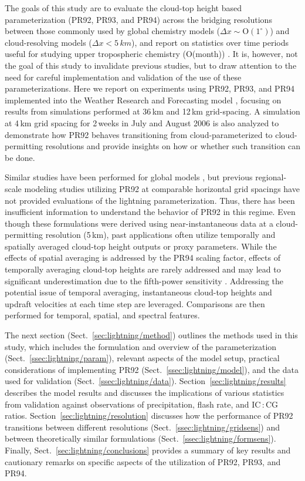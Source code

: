 The goals of this study are to evaluate the cloud-top height based
parameterization (PR92, PR93, and PR94) across the bridging resolutions
between those commonly used by global chemistry models
($\Delta x\sim\mathrm{O}(1^\circ)$) and cloud-resolving models ($\Delta x < 5\,\unit{km}$),
and report on statistics over time periods useful for
studying upper tropospheric chemistry (O(\unit{month}))
\citep{Stevenson:2006fk}. It is, however, not the goal of this study to
invalidate previous studies, but to draw attention to the need for careful
implementation and validation of the use of these parameterizations. Here we
report on experiments using PR92, PR93, and PR94 implemented into the Weather
Research and Forecasting model \citep[WRF;][]{Skamarock:2008xx}, focusing on
results from simulations performed at 36\,\unit{km} and 12\,\unit{km}
grid-spacing. A simulation at 4\,\unit{km} grid spacing for 2\,weeks in July
and August 2006 is also analyzed to demonstrate how PR92 behaves
transitioning from cloud-parameterized to cloud-permitting resolutions and
provide insights on how or whether such transition can be done.

 Similar studies have been performed for global models \citep[e.g.,][]{Tost:2007rw},
 but previous regional-scale modeling studies utilizing PR92 at comparable horizontal
 grid spacings have not provided evaluations of the lightning parameterization. Thus,
 there has been insufficient information to understand the behavior of PR92 in this regime.
 Even though these formulations were derived using near-instantaneous data at a cloud-permitting
 resolution (5\,\unit{km}), past applications often utilize temporally and spatially averaged cloud-top
 height outputs or proxy parameters. While the effects of spatial averaging is addressed by the PR94
 scaling factor, effects of temporally averaging cloud-top heights are rarely addressed and may lead
 to significant underestimation due to the fifth-power sensitivity \citep{Allen:2002fk}. Addressing
 the potential issue of temporal averaging, instantaneous cloud-top heights and updraft velocities
 at each time step are leveraged. Comparisons are then performed for temporal, spatial, and spectral features.

The next section (Sect.~\ref{sec:lightning/method}) outlines the methods used in this
study, which includes the formulation and overview of the parameterization
(Sect.~\ref{ssec:lightning/param}), relevant aspects of the model setup, practical
considerations of implementing PR92 (Sect.~\ref{ssec:lightning/model}), and the data
used for validation (Sect.~\ref{ssec:lightning/data}). Section~\ref{sec:lightning/results}
describes the model results and discusses the implications of various
statistics from validation against observations of precipitation, flash rate,
and IC\,:\,CG ratios. Section~\ref{sec:lightning/resolution} discusses how the
performance of PR92 transitions between different resolutions
(Sect.~\ref{ssec:lightning/gridsens}) and between theoretically similar formulations
(Sect.~\ref{ssec:lightning/formsens}). Finally, Sect.~\ref{sec:lightning/conclusions} provides
a summary of key results and cautionary remarks on specific aspects of the
utilization of PR92, PR93, and PR94.

